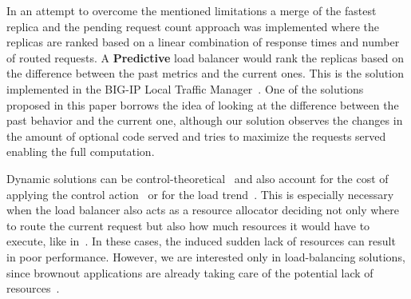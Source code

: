 
In an attempt to overcome the mentioned limitations a merge of the
fastest replica and the pending request count approach was implemented
where the replicas are ranked based on a linear combination of
response times and number of routed requests. A \textbf{Predictive}
load balancer would rank the replicas based on the difference between
the past metrics and the current ones. This is the solution
implemented in the BIG-IP Local Traffic Manager~\cite{BIGIP}. One of
the solutions proposed in this paper borrows the idea of looking at
the difference between the past behavior and the current one, although
our solution observes the changes in the amount of optional code
served and tries to maximize the requests served enabling the full
computation.

Dynamic solutions can be
control-theoretical~\cite{multipathctlb,comparisonstaticdynamic} and
also account for the cost of applying the control
action~\cite{costofcontrol} or for the load trend~\cite{CasolariSA}.
This is especially necessary when the load balancer also acts as a
resource allocator deciding not only where to route the current
request but also how much resources it would have to execute, 
like in~\cite{Ardagnaalltogether}. In these cases, the induced 
sudden lack of resources can result in poor performance. However, we 
are interested only in load-balancing solutions, since brownout applications
are already taking care of the potential lack of resources~\cite{cloudish-tr}.

